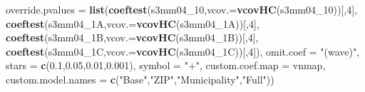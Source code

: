 \documentclass[
]{article}
\newenvironment{Shaded}{\begin{snugshade}}{\end{snugshade}}
\newcommand{\DataTypeTok}[1]{\textcolor[rgb]{0.13,0.29,0.53}{#1}}
\newcommand{\DecValTok}[1]{\textcolor[rgb]{0.00,0.00,0.81}{#1}}
\newcommand{\FloatTok}[1]{\textcolor[rgb]{0.00,0.00,0.81}{#1}}
\newcommand{\KeywordTok}[1]{\textcolor[rgb]{0.13,0.29,0.53}{\textbf{#1}}}
\newcommand{\NormalTok}[1]{#1}
\newcommand{\StringTok}[1]{\textcolor[rgb]{0.31,0.60,0.02}{#1}}
\begin{document}
\begin{Shaded}
\begin{Highlighting}[]
          \DataTypeTok{override.pvalues =} \KeywordTok{list}\NormalTok{(}\KeywordTok{coeftest}\NormalTok{(s3mm04_}\DecValTok{10}\NormalTok{,}\DataTypeTok{vcov.=}\KeywordTok{vcovHC}\NormalTok{(s3mm04_}\DecValTok{10}\NormalTok{))[,}\DecValTok{4}\NormalTok{],}
                                  \KeywordTok{coeftest}\NormalTok{(s3mm04_1A,}\DataTypeTok{vcov.=}\KeywordTok{vcovHC}\NormalTok{(s3mm04_1A))[,}\DecValTok{4}\NormalTok{],}
                                  \KeywordTok{coeftest}\NormalTok{(s3mm04_1B,}\DataTypeTok{vcov.=}\KeywordTok{vcovHC}\NormalTok{(s3mm04_1B))[,}\DecValTok{4}\NormalTok{],}
                                  \KeywordTok{coeftest}\NormalTok{(s3mm04_1C,}\DataTypeTok{vcov.=}\KeywordTok{vcovHC}\NormalTok{(s3mm04_1C))[,}\DecValTok{4}\NormalTok{]),}
          \DataTypeTok{omit.coef =} \StringTok{"(wave)"}\NormalTok{, }\DataTypeTok{stars =} \KeywordTok{c}\NormalTok{(}\FloatTok{0.1}\NormalTok{,}\FloatTok{0.05}\NormalTok{,}\FloatTok{0.01}\NormalTok{,}\FloatTok{0.001}\NormalTok{), }\DataTypeTok{symbol =} \StringTok{"+"}\NormalTok{,}
          \DataTypeTok{custom.coef.map =}\NormalTok{ vnmap, }
          \DataTypeTok{custom.model.names =} \KeywordTok{c}\NormalTok{(}\StringTok{"Base"}\NormalTok{,}\StringTok{"ZIP"}\NormalTok{,}\StringTok{"Municipality"}\NormalTok{,}\StringTok{"Full"}\NormalTok{))}
\end{Highlighting}
\end{Shaded}
\end{document}
